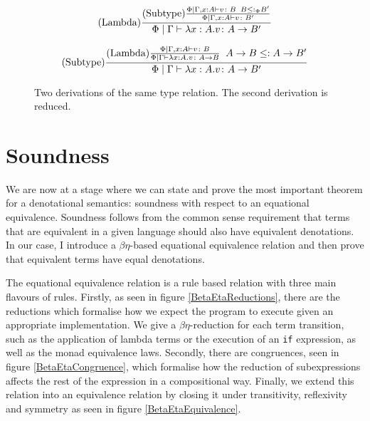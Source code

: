 \documentclass{Report}
\begin{document}
\begin{figure}[h!]
\begin{equation}
    (\text{Lambda}) \frac{
        (\text{Subtype}) \frac{
            \Phi\mid\Gamma, x: A \vdash v \colon B
            \;\;
            B \leq:_\Phi B'
        }{
            \Phi\mid\Gamma, x: A \vdash v \colon B'
        }
    }{\Phi\mid\Gamma \vdash \lambda x : A. v \colon A\rightarrow B'}
\end{equation}

\begin{equation}
    (\text{Subtype}) \frac{    (\text{Lambda}) \frac{
            \Phi\mid\Gamma, x: A \vdash v \colon B
    }{\Phi\mid\Gamma \vdash \lambda x : A. v \colon A\rightarrow B}
    \;\; A\rightarrow B \leq: A\rightarrow B'}{\Phi\mid\Gamma \vdash \lambda x : A. v \colon A\rightarrow B'}
\end{equation}
    \caption{Two derivations of the same type relation. The second derivation is reduced.}
\end{figure}

\section{Soundness}
We are now at a stage where we can state and prove the most important theorem for a denotational semantics: soundness with respect to an equational equivalence. Soundness follows from the common sense requirement that terms that are equivalent in a given language should also have equivalent denotations. In our case, I introduce a $\beta\eta$-based equational equivalence relation and then prove that equivalent terms have equal denotations.

The equational equivalence relation is a rule based relation with three main flavours of rules. Firstly, as seen in figure \ref{BetaEtaReductions}, there are the reductions which formalise how we expect the program to execute given an appropriate implementation. We give a $\beta\eta$-reduction for each term transition, such as the application of lambda terms or the execution of an \texttt{if} expression, as well as the monad equivalence laws. Secondly, there are congruences, seen in figure \ref{BetaEtaCongruence}, which formalise how the reduction of subexpressions affects the rest of the expression in a compositional way. Finally, we extend this relation into an equivalence relation by closing it under transitivity, reflexivity and symmetry as seen in figure \ref{BetaEtaEquivalence}.
\end{document}
